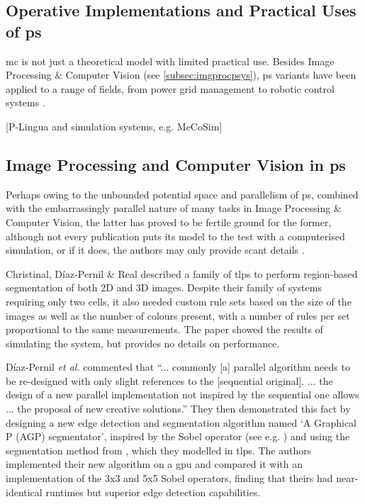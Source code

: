 \subsection{\label{sec:psystemsuses}Operative Implementations and Practical Uses of \texorpdfstring{\gls{ps}}{P systems}}
\Gls{mc} is not just a theoretical model with limited practical use.  Besides Image Processing \& Computer Vision (see \autoref{subsec:imgprocpsys}), \gls{ps} variants have been applied to a range of fields, from power grid management to robotic control systems \cite{Zhang2017}.

[P-Lingua and simulation systems, e.g. MeCoSim]

\subsection{\label{subsec:imgprocpsys}Image Processing and Computer Vision in \texorpdfstring{\gls{ps}}{P systems}}

Perhaps owing to the unbounded potential space and parallelism of \gls{ps}, combined with the embarrassingly parallel nature of many tasks in Image Processing \& Computer Vision, the latter has proved to be fertile ground for the former, although not every publication puts its model to the test with a computerised simulation, or if it does, the authors may only provide scant details \cite{Diaz-Pernil2019}.

Christinal, Díaz-Pernil \& Real \cite{Christinal2011} described a family of \gls{tlps} to perform region-based segmentation of both 2D and 3D images.  Despite their family of systems requiring only two cells, it also needed custom rule sets based on the size of the images as well as the number of colours present, with a number of rules per set proportional to the same measurements.  The paper showed the results of simulating the system, but provides no details on performance.

Díaz-Pernil \textit{et al.} \cite{Diaz-Pernil2013} commented that ``... commonly [a] parallel algorithm needs to be re-designed with only slight references to the [sequential original].  ... the design of a new parallel implementation not inspired by the sequential one allows ... the proposal of new creative solutions.''  They then demonstrated this fact by designing a new edge detection and segmentation algorithm named `A Graphical P (AGP) segmentator', inspired by the Sobel operator (see e.g. \cite{Nixon2012}) and using the segmentation method from \cite{Christinal2011}, which they modelled in \gls{tlps}.  The authors implemented their new algorithm on a \gls{gpu} and compared it with an implementation of the 3x3 and 5x5 Sobel operators, finding that theirs had near-identical runtimes but superior edge detection capabilities.

